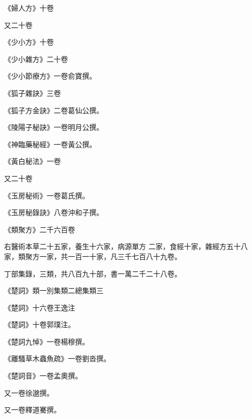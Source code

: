 \begin{pinyinscope}
 《婦人方》十卷



 又二十卷



 《少小方》十卷



 《少小雜方》二十卷



 《少小節療方》一卷俞寶撰。



 《狐子雜訣》三卷



 《狐子方金訣》二卷葛仙公撰。



 《陵陽子秘訣》一卷明月公撰。



 《神臨藥秘經》一卷黃公撰。



 《黃白秘法》一卷



 又二十卷



 《玉房秘術》一卷葛氏撰。



 《玉房秘錄訣》八卷沖和子撰。



 《類聚方》二千六百卷



 右醫術本草二十五家，養生十六家，病源單方
 二家，食經十家，雜經方五十八家，類聚方一家，共一百一十家，凡三千七百八十九卷。



 丁部集錄，三類，共八百九十部，書一萬二千二十八卷。



 《楚詞》類一別集類二總集類三



 《楚詞》十六卷王逸注



 《楚詞》十卷郭璞注。



 《楚詞九悼》一卷楊穆撰。



 《離騷草木蟲魚疏》一卷劉沓撰。



 《楚詞音》一卷孟奧撰。



 又一卷徐邈撰。



 又一卷釋道騫撰。




\end{pinyinscope}

